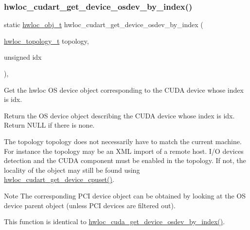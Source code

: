 \subsubsection{\texorpdfstring{hwloc\+\_\+cudart\+\_\+get\+\_\+device\+\_\+osdev\+\_\+by\+\_\+index()}{hwloc\_cudart\_get\_device\_osdev\_by\_index()}}
{\footnotesize\ttfamily static \hyperlink{a00185_ga79b8ab56877ef99ac59b833203391c7d}{hwloc\+\_\+obj\+\_\+t} hwloc\+\_\+cudart\+\_\+get\+\_\+device\+\_\+osdev\+\_\+by\+\_\+index (\begin{DoxyParamCaption}\item[{\hyperlink{a00186_ga9d1e76ee15a7dee158b786c30b6a6e38}{hwloc\+\_\+topology\+\_\+t}}]{topology,  }\item[{unsigned}]{idx }\end{DoxyParamCaption})\hspace{0.3cm}{\ttfamily [inline]}, {\ttfamily [static]}}



Get the hwloc OS device object corresponding to the C\+U\+DA device whose index is {\ttfamily idx}. 

Return the OS device object describing the C\+U\+DA device whose index is {\ttfamily idx}. Return N\+U\+LL if there is none.

The topology {\ttfamily topology} does not necessarily have to match the current machine. For instance the topology may be an X\+ML import of a remote host. I/O devices detection and the C\+U\+DA component must be enabled in the topology. If not, the locality of the object may still be found using \hyperlink{a00220_ga187ca00c6e12800a25151ce331620980}{hwloc\+\_\+cudart\+\_\+get\+\_\+device\+\_\+cpuset()}.

\begin{DoxyNote}{Note}
The corresponding P\+CI device object can be obtained by looking at the OS device parent object (unless P\+CI devices are filtered out).

This function is identical to \hyperlink{a00219_ga12ee892994ed037e8f64bbffda02cf2e}{hwloc\+\_\+cuda\+\_\+get\+\_\+device\+\_\+osdev\+\_\+by\+\_\+index()}. 
\end{DoxyNote}
\mbox{\label{a00220_gad8b701d9a34923e34bd58defd4c1e704}} 
